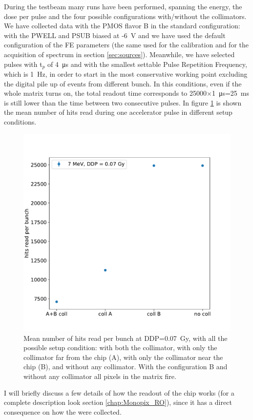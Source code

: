    During the testbeam many runs have been performed, spanning the energy, the dose per pulse and the four possible configurations with/without the collimators. 
   We have collected data with the PMOS flavor B in the standard configuration: with the PWELL and PSUB biased at -\SI{6}{V} and we have used the default configuration of the FE parameters (the same used for the calibration and for the acquisition of spectrum in section \ref{sec:sources}).
   Meanwhile, we have selected pulses with t$_p$ of \SI{4}{\us} and with the smallest settable Pulse Repetition Frequency, which is \SI{1}{Hz}, in order to start in the most conservative working point excluding the digital pile up of events from different bunch. In this conditions, even if the whole matrix turns on, the total readout time corresponds to 25000$\times$\SI{1}{\us}=\SI{25}{ms} is still lower than the time between two consecutive pulses.
   In figure \ref{fig:hits_FLASH} is shown the mean number of hits read during one accelerator pulse in different setup conditions.
   \begin{figure}
      \centering
      \includegraphics[width=.49\linewidth]{figures/test_beam/hits.pdf}
      \caption{Mean number of hits read per bunch at DDP=\SI{0.07}{Gy}, with all the possible setup condition: with both the collimator, with only the collimator far from the chip (A), with only the collimator near the chip (B), and without any collimator. With the configuration B and without any collimator all pixels in the matrix fire.}
      \label{fig:hits_FLASH}
   \end{figure}

   
  I will briefly discuss a few details of how the readout of the chip works (for a complete description look section \ref{chap:Monopix_RO}), since it has a direct consequence on how the were collected. 

